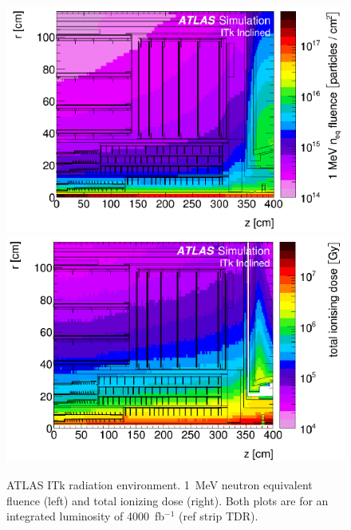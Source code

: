 \begin{figure}[ht]
\centering
\includegraphics[width=0.48\linewidth]{figures/fluence.pdf}\quad
\includegraphics[width=0.48\linewidth]{figures/TID.pdf}
\caption{ATLAS ITk radiation environment. 1~MeV neutron equivalent fluence (left) and total ionizing dose (right). Both plots are for an integrated luminosity of 4000~fb$^{-1}$ (ref strip TDR).}
\label{fig:radiation}
\end{figure}



